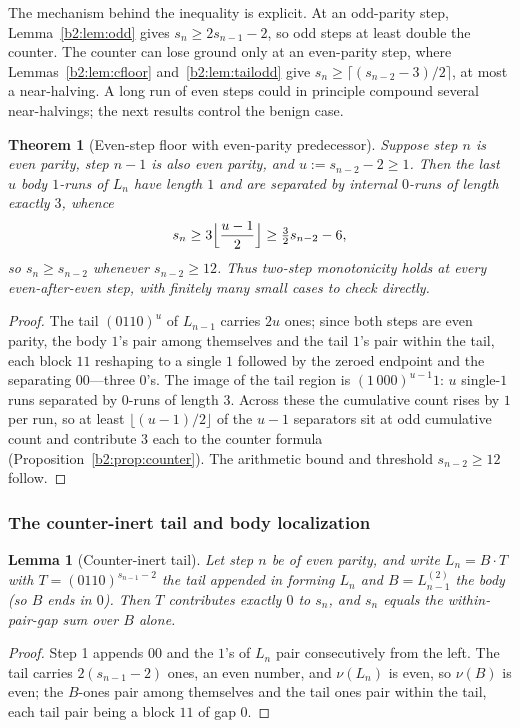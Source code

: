 \documentclass[a4paper]{article}
\theoremstyle{plain}
\newtheorem{thm}[theorem]{Theorem}
\newtheorem{lemma}{Lemma}[subsection]
\theoremstyle{definition}
\theoremstyle{remark}
\begin{document}
The mechanism behind the inequality is explicit. At an odd-parity step, Lemma~\ref{b2:lem:odd} gives $s_n\ge 2s_{n-1}-2$, so odd steps at least double the counter. The counter can lose ground only at an even-parity step, where Lemmas~\ref{b2:lem:cfloor} and~\ref{b2:lem:tailodd} give $s_n\ge\lceil(s_{n-2}-3)/2\rceil$, at most a near-halving. A long run of even steps could in principle compound several near-halvings; the next results control the benign case.

\begin{thm}[Even-step floor with even-parity predecessor]\label{b2:thm:floor}
Suppose step $n$ is even parity, step $n-1$ is also even parity, and $u:=s_{n-2}-2\ge 1$. Then the last $u$ body $1$-runs of $L_n$ have length $1$ and are separated by internal $0$-runs of length exactly $3$, whence
\[ s_n\ge 3\Bigl\lfloor\frac{u-1}{2}\Bigr\rfloor\ge \tfrac32 s_{n-2}-6, \]
so $s_n\ge s_{n-2}$ whenever $s_{n-2}\ge 12$. Thus two-step monotonicity holds at every even-after-even step, with finitely many small cases to check directly.
\end{thm}
\begin{proof}
The tail $(0110)^u$ of $L_{n-1}$ carries $2u$ ones; since both steps are even parity, the body $1$'s pair among themselves and the tail $1$'s pair within the tail, each block $11$ reshaping to a single $1$ followed by the zeroed endpoint and the separating $00$---three $0$'s. The image of the tail region is $(1\,000)^{u-1}1$: $u$ single-$1$ runs separated by $0$-runs of length $3$. Across these the cumulative count rises by $1$ per run, so at least $\lfloor(u-1)/2\rfloor$ of the $u-1$ separators sit at odd cumulative count and contribute $3$ each to the counter formula (Proposition~\ref{b2:prop:counter}). The arithmetic bound and threshold $s_{n-2}\ge 12$ follow.
\end{proof}

\subsubsection{The counter-inert tail and body localization}\label{b2:sec:inert}
\begin{lemma}[Counter-inert tail]\label{b2:lem:inert}
Let step $n$ be of even parity, and write $L_n=B\cdot T$ with $T=(0110)^{s_{n-1}-2}$ the tail appended in forming $L_n$ and $B=L^{(2)}_{n-1}$ the body (so $B$ ends in $0$). Then $T$ contributes exactly $0$ to $s_n$, and $s_n$ equals the within-pair-gap sum over $B$ alone.
\end{lemma}
\begin{proof}
Step 1 appends $00$ and the $1$'s of $L_n$ pair consecutively from the left. The tail carries $2(s_{n-1}-2)$ ones, an even number, and $\nu(L_n)$ is even, so $\nu(B)$ is even; the $B$-ones pair among themselves and the tail ones pair within the tail, each tail pair being a block $11$ of gap $0$.
\end{proof}
\end{document}
